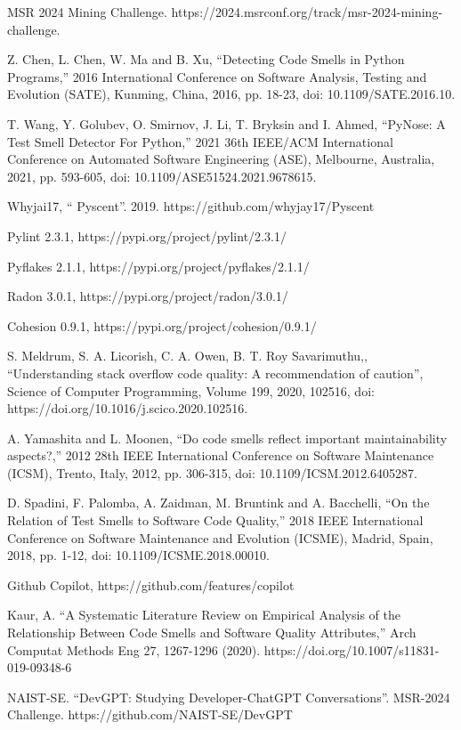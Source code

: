 \documentclass[conference]{IEEEtran}
\begin{document}
\begin{thebibliography}{00}
     MSR 2024 Mining Challenge. https://2024.msrconf.org/track/msr-2024-mining-challenge.

      Z. Chen, L. Chen, W. Ma and B. Xu, ``Detecting Code Smells in Python Programs,'' 2016 International Conference on Software Analysis, Testing and Evolution (SATE), Kunming, China, 2016, pp. 18-23, doi: 10.1109/SATE.2016.10.

     T. Wang, Y. Golubev, O. Smirnov, J. Li, T. Bryksin and I. Ahmed, ``PyNose: A Test Smell Detector For Python,'' 2021 36th IEEE/ACM International Conference on Automated Software Engineering (ASE), Melbourne, Australia, 2021, pp. 593-605, doi: 10.1109/ASE51524.2021.9678615.

     Whyjai17, `` Pyscent''. 2019. https://github.com/whyjay17/Pyscent

     Pylint 2.3.1, https://pypi.org/project/pylint/2.3.1/

     Pyflakes 2.1.1, https://pypi.org/project/pyflakes/2.1.1/

     Radon 3.0.1, https://pypi.org/project/radon/3.0.1/

     Cohesion 0.9.1, https://pypi.org/project/cohesion/0.9.1/

     S. Meldrum, S. A. Licorish, C. A. Owen, B. T. Roy Savarimuthu,, ``Understanding stack overflow code quality: A recommendation of caution'', Science of Computer Programming, Volume 199, 2020, 102516, doi: https://doi.org/10.1016/j.scico.2020.102516.

     A. Yamashita and L. Moonen, ``Do code smells reflect important maintainability aspects?,'' 2012 28th IEEE International Conference on Software Maintenance (ICSM), Trento, Italy, 2012, pp. 306-315, doi: 10.1109/ICSM.2012.6405287.

     D. Spadini, F. Palomba, A. Zaidman, M. Bruntink and A. Bacchelli, ``On the Relation of Test Smells to Software Code Quality,'' 2018 IEEE International Conference on Software Maintenance and Evolution (ICSME), Madrid, Spain, 2018, pp. 1-12, doi: 10.1109/ICSME.2018.00010.

     Github Copilot, https://github.com/features/copilot

     Kaur, A. ``A Systematic Literature Review on Empirical Analysis of the Relationship Between Code Smells and Software Quality Attributes,'' Arch Computat Methods Eng 27, 1267-1296 (2020). https://doi.org/10.1007/s11831-019-09348-6

     NAIST-SE. ``DevGPT: Studying Developer-ChatGPT Conversations''. MSR-2024 Challenge. https://github.com/NAIST-SE/DevGPT

\end{thebibliography}
\end{document}
